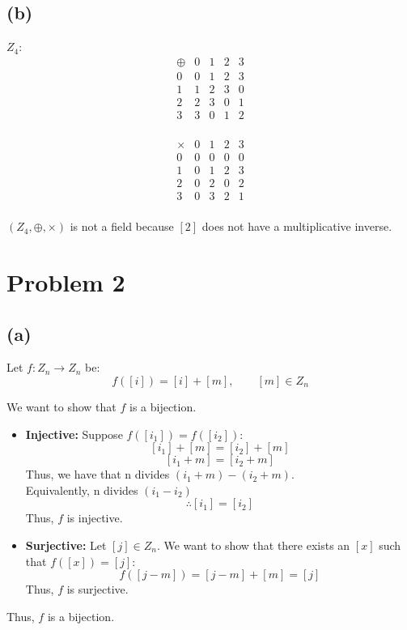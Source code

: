 \documentclass{article}
\begin{document}
\subsection*{(b)}
\(Z_4\):
\[
   \begin{array}{c|cccc}
   \oplus & 0 & 1 & 2 & 3 \\\hline
   0 & 0 & 1 & 2 & 3 \\
   1 & 1 & 2 & 3 & 0 \\
   2 & 2 & 3 & 0 & 1 \\
   3 & 3 & 0 & 1 & 2 \\
   \end{array}
\]

\[
\begin{array}{c|cccc}
\times & 0 & 1 & 2 & 3 \\\hline
0 & 0 & 0 & 0 & 0 \\
1 & 0 & 1 & 2 & 3 \\
2 & 0 & 2 & 0 & 2 \\
3 & 0 & 3 & 2 & 1 \\
\end{array}
\]

\((Z_4, \oplus, \times)\) is not a field because \([2]\) does not have a multiplicative inverse. \\

\section*{Problem 2}


\subsection*{(a)}

Let \(f: Z_n \to Z_n\) be:
\[
   f([i]) = [i] + [m], \qquad [m] \in Z_n
\]

We want to show that \(f\) is a bijection.
\begin{itemize}
   \item \textbf{Injective:} Suppose \(f([i_1]) = f([i_2])\):
   \[
      [i_1] + [m] = [i_2] + [m]
   \]
   \[
      [i_1 + m] = [i_2 + m]
   \]
   Thus, we have that n divides \((i_1 + m) - (i_2 + m)\). 
    \\ Equivalently, n divides  \((i_1-i_2)\) 
   \[
     \therefore [i_1] = [i_2]
   \]
   Thus, \(f\) is injective.
   \item \textbf{Surjective:} Let \([j] \in Z_n\). We want to show that there exists an \([x]\) such that \(f([x]) = [j]\):
   \[
      f([j - m]) = [j - m] + [m] = [j]
   \]
   Thus, \(f\) is surjective.
\end{itemize}
Thus, \(f\) is a bijection.
\end{document}
